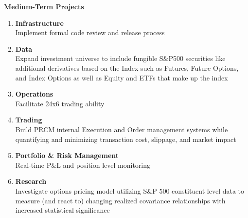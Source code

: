 \documentclass[6pt]{article}
\begin{document}
\textbf{\Large{Medium-Term Projects}} \\
\begin{enumerate}
  \item \textbf{Infrastructure} \\
    Implement formal code review and release process
  \item \textbf{Data} \\
    Expand investment universe to include fungible S\&P500 securities like
    additional derivatives based on the Index such as Futures, Future Options,
    and Index Options as well as Equity and ETFs that make up the index
  \item \textbf{Operations} \\
    Facilitate 24x6 trading ability
  \item \textbf{Trading} \\
    Build PRCM internal Execution and Order management systems while quantifying
    and minimizing transaction cost, slippage, and market impact
  \item \textbf{Portfolio \& Risk Management} \\
    Real-time P\&L and position level monitoring
  \item \textbf{Research} \\
    Investigate options pricing model utilizing S\&P 500 constituent level data
    to measure (and react to) changing realized covariance relationships with
    increased statistical significance
\end{enumerate}

\vspace{0.1in}
\end{document}
